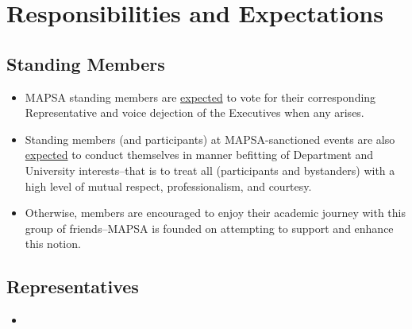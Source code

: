 \documentclass[8pt]{article}
\begin{document}
	\section{Responsibilities and Expectations}
	\subsection{Standing Members}
	\begin{itemize}
		\item MAPSA standing members are \underline{expected} to vote for their corresponding Representative and voice dejection of the Executives when any arises. 
		\item Standing members (and participants) at MAPSA-sanctioned events are also \underline{expected} to conduct themselves in manner befitting of Department and University interests--that is to treat all (participants and bystanders) with a high level of mutual respect, professionalism, and courtesy. 
		\item Otherwise, members are encouraged to enjoy their academic journey with this group of friends--MAPSA is founded on attempting to support and enhance this notion.
	\end{itemize}
	\subsection{Representatives}
	\begin{itemize}
		\item
	\end{itemize}
\end{document}
